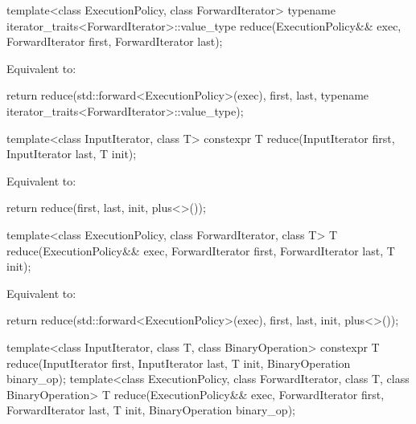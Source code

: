 %
\begin{itemdecl}
template<class ExecutionPolicy, class ForwardIterator>
  typename iterator_traits<ForwardIterator>::value_type
    reduce(ExecutionPolicy&& exec,
           ForwardIterator first, ForwardIterator last);
\end{itemdecl}

\begin{itemdescr}
\pnum
\effects
Equivalent to:
\begin{codeblock}
return reduce(std::forward<ExecutionPolicy>(exec), first, last,
              typename iterator_traits<ForwardIterator>::value_type{});
\end{codeblock}
\end{itemdescr}


%
\begin{itemdecl}
template<class InputIterator, class T>
  constexpr T reduce(InputIterator first, InputIterator last, T init);
\end{itemdecl}

\begin{itemdescr}
\pnum
\effects
Equivalent to:
\begin{codeblock}
return reduce(first, last, init, plus<>());
\end{codeblock}
\end{itemdescr}

%
\begin{itemdecl}
template<class ExecutionPolicy, class ForwardIterator, class T>
  T reduce(ExecutionPolicy&& exec,
           ForwardIterator first, ForwardIterator last, T init);
\end{itemdecl}

\begin{itemdescr}
\pnum
\effects
Equivalent to:
\begin{codeblock}
return reduce(std::forward<ExecutionPolicy>(exec), first, last, init, plus<>());
\end{codeblock}
\end{itemdescr}


%
\begin{itemdecl}
template<class InputIterator, class T, class BinaryOperation>
  constexpr T reduce(InputIterator first, InputIterator last, T init,
                     BinaryOperation binary_op);
template<class ExecutionPolicy, class ForwardIterator, class T, class BinaryOperation>
  T reduce(ExecutionPolicy&& exec,
           ForwardIterator first, ForwardIterator last, T init,
           BinaryOperation binary_op);
\end{itemdecl}


